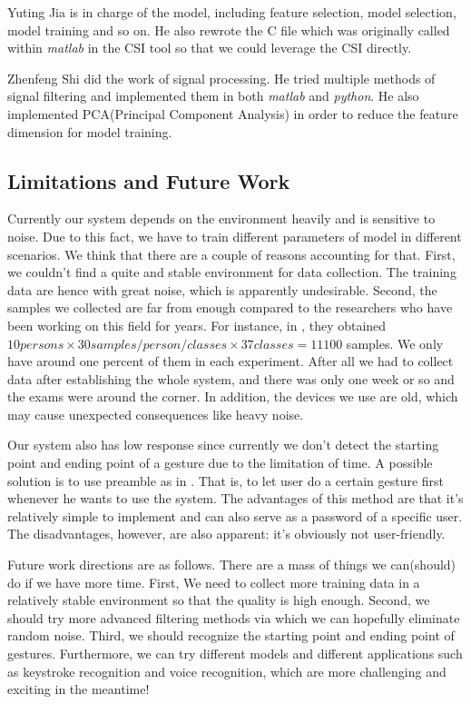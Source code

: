 \documentclass[conference]{IEEEtran}
\begin{document}
Yuting Jia is in charge of the model, including feature selection, model selection, model training and so on. He also rewrote the C file which was originally called within \emph{matlab} in the CSI tool so that we could leverage the CSI directly.

Zhenfeng Shi did the work of signal processing. He tried multiple methods of signal filtering and implemented them in both \emph{matlab} and \emph{python}. He also implemented PCA(Principal Component Analysis) in order to reduce the feature dimension for model training.


\subsection{Limitations and Future Work}
Currently our system depends on the environment heavily and is sensitive to noise. Due to this fact, we have to train different parameters of model in different scenarios. We think that there are a couple of reasons accounting for that. 
First, we couldn't find a quite and stable environment for data collection. The training data are hence with great noise, which is apparently undesirable. 
Second, the samples we collected are far from enough compared to the researchers who have been working on this field for years. For instance, in \cite{ali2015keystroke}, they obtained $10 persons \times 30samples/person/classes \times 37classes = 11100$ samples. We only have around one percent of them in each experiment. After all we had to collect data after establishing the whole system, and there was only one week or so and the exams were around the corner. In addition, the devices we use are old, which may cause unexpected consequences like heavy noise.

Our system also has low response since currently we don't detect the starting point and ending point of a gesture due to the limitation of time. A possible solution is to use preamble as in \cite{pu2013whole}. That is, to let user do a certain gesture first whenever he wants to use the system. The advantages of this method are that it's relatively simple to implement and can also serve as a password of a specific user. The disadvantages, however, are also apparent: it's obviously not user-friendly.

Future work directions are as follows. There are a mass of things we can(should) do if we have more time. First, We need to collect more training data in a relatively stable environment so that the quality is high enough. Second, we should try more advanced filtering methods via which we can hopefully eliminate random noise. Third, we should recognize the starting point and ending point of gestures. Furthermore, we can try different models and different applications such as keystroke recognition and voice recognition, which are more challenging and exciting in the meantime!
\end{document}
